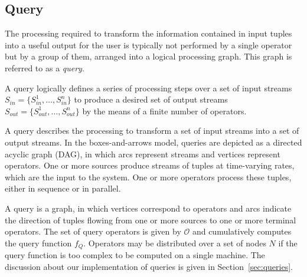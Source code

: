 \vspace{-10pt}
\subsection*{Query}
The processing required to transform the information contained in input tuples into a useful
output for the user is typically not performed by a single operator but by a group of them, arranged into
a logical processing graph. This graph is referred to as a \emph{query}.

 \begin{definition}[Query]{
A query logically defines a series of processing steps over a set of input streams 
$S_{in}=\{S_{in}^1,\dots,S_{in}^n\}$ to produce a desired set of output streams 
$S_{out}=\{S_{out}^1,\dots,S_{out}^n\}$ by the means of a finite number of operators.
}
\end{definition}

A query describes the processing to transform a set of input streams into a set of output streams.
In the boxes-and-arrows model, queries are depicted as a directed acyclic graph (DAG), in which arcs
represent streams and vertices represent operators. One or more sources produce streams of tuples at
time-varying rates, which are the input to the system. One or more operators process these
tuples, either in sequence or in parallel.

A query is a graph, in which vertices correspond to operators and arcs indicate the direction of tuples
flowing from one or more sources to one or more terminal operators. The set of query operators is
given by $\mathcal{O}$ and cumulatively computes the query function $f_Q$. Operators may be distributed
over a set of nodes $N$ if the query function is too complex to be computed on a single machine.
The discussion about our implementation of queries is given in Section~\ref{sec:queries}.

